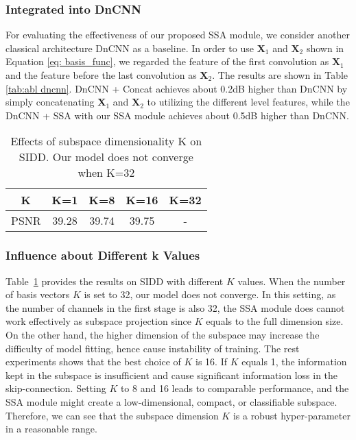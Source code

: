 \documentclass[final]{cvpr}
\newcommand{\bs}{\boldsymbol}
\newcommand{\Xa}{\bs{X}_{1}}
\newcommand{\Xb}{\bs{X}_{2}}
\begin{document}
\subsubsection{Integrated into DnCNN}
For evaluating the effectiveness of our proposed SSA module, we consider another classical architecture DnCNN as a baseline. In order to use $\Xa$ and $\Xb$ shown in Equation \ref{eq: basis_func},  we regarded the feature of the first convolution as $\Xa$ and the feature before the last convolution as $\Xb$.  The results are shown in Table \ref{tab:abl dncnn}.  DnCNN + Concat achieves about 0.2dB higher than DnCNN by simply concatenating $\Xa$  and $\Xb$ to utilizing the different level features,  while the DnCNN + SSA  with our SSA module achieves about 0.5dB higher than DnCNN.





\begin{table}[t]
   \centering

   \begin{tabular}{c c c c c}
   \toprule
      K & K=1 & K=8 & K=16 & K=32 \\
   \midrule
   PSNR &  39.28 & 39.74 & 39.75 & -\\
   \bottomrule
   \end{tabular}
      \caption{Effects of subspace dimensionality K on SIDD. Our model does not converge when K=32}
    \label{tab:k exps}
\end{table} \subsubsection{Influence about Different k Values}
Table~\ref{tab:k exps} provides the results on SIDD with different $K$ values. 
When the number of basis vectors $K$ is set to 32, our model does not converge. In this 
setting, as the number of channels in the first stage is also 32, the SSA module does
cannot work effectively as subspace projection since $K$ equals to the full dimension size. On the other hand, the higher dimension of the subspace may increase the difficulty of
model fitting, hence cause instability of training.
The rest experiments shows that the best choice of $K$ is 16. If $K$ equals 1, the information kept in the subspace is insufficient and cause significant 
information loss in the skip-connection. 
Setting $K$ to 8 and 16 leads to comparable performance, and the SSA module might create a low-dimensional, compact, or classifiable subspace. Therefore, we can see that the subspace dimension $K$ is a robust hyper-parameter in a reasonable range.
\end{document}
